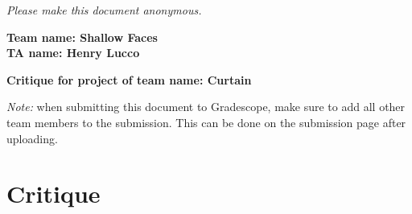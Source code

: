 \emph{Please make this document anonymous.}

\textbf{Team name: Shallow Faces}\\
\textbf{TA name: Henry Lucco}

\textbf{Critique for project of team name: Curtain}

\emph{Note:} when submitting this document to Gradescope, make sure to add all other team members to the submission. This can be done on the submission page after uploading.






\section*{Critique}

